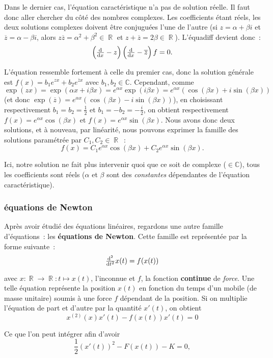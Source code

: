 \documentclass{article}
\DeclareMathOperator{\R}{\mathbb R}
\theoremstyle{definition}
\theoremstyle{remark}
\begin{document}
			Dans le dernier cas, l'équation caractéristique n'a pas de solution réelle. Il faut donc aller chercher du côté des nombres complexes. Les coefficients
			étant réels, les deux solutions complexes doivent être conjuguées l'une de l'autre (si $z = \alpha + \beta i$ et $\overline z = \alpha - \beta i$, alors
			$z\overline z = \alpha^2 + \beta^2 \in \R$ et $z + \overline z = 2\beta \in \R$). L'équadiff devient donc~:
			\[\left(\od{}{x} - z\right)\left(\od{}{x} - \overline z\right)f = 0.\]

			L'équation ressemble fortement à celle du premier cas, donc la solution générale est $f(x) = b_1e^{zx} + b_2e^{\overline z x}$ avec $b_1, b_2 \in \mathbb C$.
			Cependant, comme $\exp(zx) = \exp(\alpha x + i\beta x) = e^{\alpha x} \exp(i\beta x) = e^{\alpha x}(\cos(\beta x) + i\sin(\beta x))$ (et donc
			$\exp(\overline z) = e^{\alpha x}(\cos(\beta x) - i\sin(\beta x))$), en choisissant respectivement $b_1 = b_2 = \frac 12$ et $b_1 = -b_2 = -\frac i2$,
			on obtient respectivement $f(x) = e^{\alpha x}\cos(\beta x)$ et $f(x) = e^{\alpha x}\sin(\beta x)$. Nous avons donc deux solutions, et à nouveau, par
			linéarité, nous pouvons exprimer la famille des solutions paramétrée par $C_1, C_2 \in \R$~:
			\[f(x) = C_1e^{\alpha x}\cos(\beta x) + C_2e^{\alpha x}\sin(\beta x).\]

			Ici, notre solution ne fait plus intervenir quoi que ce soit de complexe ($\in \mathbb C$), tous les coefficients sont réels ($\alpha$ et $\beta$ sont des
			\textit{constantes} dépendantes de l'équation caractéristique).

		\subsubsection{équations de Newton}
			Après avoir étudié des équations linéaires, regardons une autre famille d'équations~: les \textbf{équations de Newton}. Cette famille est représentée
			par la forme suivante~:
			\[\od[2]{}{t}x(t) = f(x(t))\]

			avec $x : \R \to \R : t \mapsto x(t)$, l'inconnue et $f$, la fonction \textbf{continue} de \textit{force}. Une telle équation représente
			la position $x(t)$ en fonction du temps d'un mobile (de masse unitaire) soumis à une force $f$ dépendant de la position. Si on multiplie l'équation
			de part et d'autre par la quantité $x'(t)$, on obtient
			\[x^{(2)}(x)x'(t) - f(x(t))x'(t) = 0\]

			Ce que l'on peut intégrer afin d'avoir
			\[\frac 12(x'(t))^2 - F(x(t)) - K = 0,\]
\end{document}
